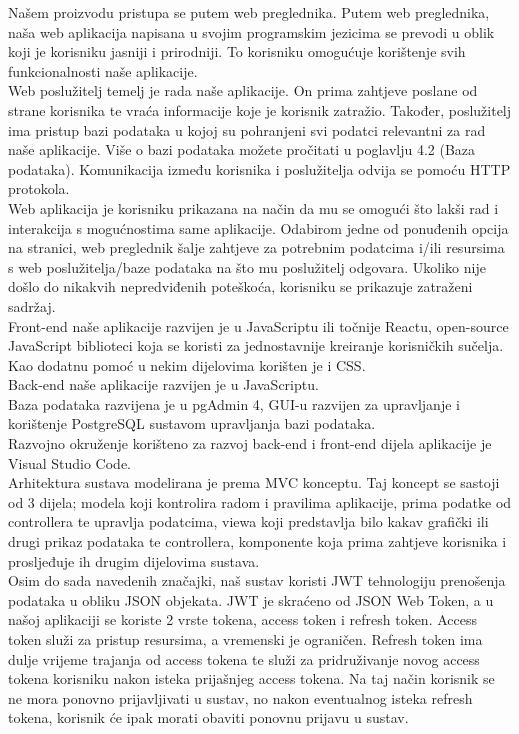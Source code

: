 \documentclass{article}
\begin{document}
		Našem proizvodu pristupa se putem web preglednika. Putem web preglednika, naša web aplikacija napisana u svojim programskim jezicima se prevodi u oblik koji je korisniku jasniji i prirodniji. To korisniku omogućuje korištenje svih funkcionalnosti naše aplikacije.\\
		Web poslužitelj temelj je rada naše aplikacije. On prima zahtjeve poslane od strane korisnika te vraća informacije koje je korisnik zatražio. Također, poslužitelj ima pristup bazi podataka u kojoj su pohranjeni svi podatci relevantni za rad naše aplikacije. Više o bazi podataka možete pročitati u poglavlju 4.2 (Baza podataka). Komunikacija između korisnika i poslužitelja odvija se pomoću HTTP protokola.\\
		Web aplikacija je korisniku prikazana na način da mu se omogući što lakši rad i interakcija s mogućnostima same aplikacije. Odabirom jedne od ponuđenih opcija na stranici, web preglednik šalje zahtjeve za potrebnim podatcima i/ili resursima s web poslužitelja/baze podataka na što mu poslužitelj odgovara. Ukoliko nije došlo do nikakvih nepredviđenih poteškoća, korisniku se prikazuje zatraženi sadržaj.\\
		Front-end naše aplikacije razvijen je u JavaScriptu ili točnije Reactu, open-source JavaScript biblioteci koja se koristi za jednostavnije kreiranje korisničkih sučelja. Kao dodatnu pomoć u nekim dijelovima korišten je i CSS.\\
		Back-end naše aplikacije razvijen je u JavaScriptu.\\
		Baza podataka razvijena je u pgAdmin 4, GUI-u razvijen za upravljanje i korištenje PostgreSQL sustavom upravljanja bazi podataka. \\
		Razvojno okruženje korišteno za razvoj back-end i front-end dijela aplikacije je Visual Studio Code.\\
		Arhitektura sustava modelirana je prema MVC konceptu. Taj koncept se sastoji od 3 dijela; modela koji kontrolira radom i pravilima aplikacije, prima podatke od controllera te upravlja podatcima, viewa koji predstavlja bilo kakav grafički ili drugi prikaz podataka te controllera, komponente koja prima zahtjeve korisnika i prosljeđuje ih drugim dijelovima sustava.\\
		Osim do sada navedenih značajki, naš sustav koristi JWT tehnologiju prenošenja podataka u obliku JSON objekata. JWT je skraćeno od JSON Web Token, a u našoj aplikaciji se koriste 2 vrste tokena, access token i refresh token. Access token služi za pristup resursima, a vremenski je ograničen. Refresh token ima dulje vrijeme trajanja od access tokena te služi za pridruživanje novog access tokena korisniku nakon isteka prijašnjeg access tokena. Na taj način korisnik se ne mora ponovno prijavljivati u sustav, no nakon eventualnog isteka refresh tokena, korisnik će ipak morati obaviti ponovnu prijavu u sustav. 
		
\end{document}
